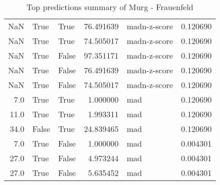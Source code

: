 \begin{table}[htp]
\begin{tabular}{rllrlr}
         NaN &           True &        True &  76.491639 & madn-z-score &  0.120690 \\
         NaN &           True &        True &  74.505017 & madn-z-score &  0.120690 \\
         NaN &           True &       False &  97.351171 & madn-z-score &  0.120690 \\
         NaN &           True &       False &  76.491639 & madn-z-score &  0.120690 \\
         NaN &           True &       False &  74.505017 & madn-z-score &  0.120690 \\
         7.0 &           True &        True &   1.000000 &          mad &  0.120690 \\
        11.0 &           True &        True &   1.993311 &          mad &  0.120690 \\
        34.0 &          False &        True &  24.839465 &          mad &  0.120690 \\
         7.0 &           True &       False &   1.000000 &          mad &  0.004301 \\
        27.0 &           True &       False &   4.973244 &          mad &  0.004301 \\
        27.0 &           True &       False &   5.635452 &          mad &  0.004301 \\
\bottomrule
\end{tabular}
\caption{Top predictions summary of Murg - Frauenfeld}
\label{table:2386-ch-top-predictions-summary}
\end{table}
